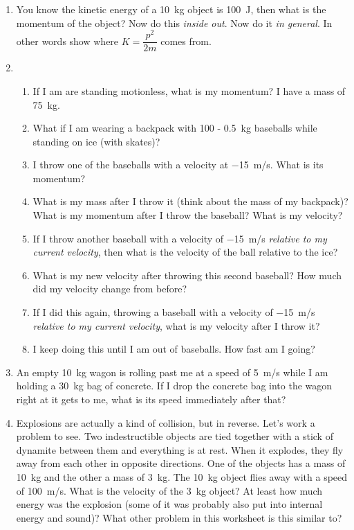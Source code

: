 \documentclass[letterpaper,12pt]{article}
\let\olditem\item
\renewcommand{\item}{\Needspace{6\baselineskip}\olditem}
\renewcommand{\bigskip}{\needspace{1in}\vspace{1in}}
\newcommand{\hugeskip}{\needspace{2in}\vspace{2in}}
\begin{document}
\begin{enumerate}
	
	\item You know the kinetic energy of a \SI{10}{kg} object is \SI{100}{\joule}, then what is the momentum of the object? Now do this \emph{inside out}. Now do it \emph{in general}. In other words show where $K=\dfrac{p^2}{2m}$ comes from.
	
	\item
	\begin{enumerate}
		\item If I am are standing motionless, what is my momentum? I have a mass of \SI{75}{kg}.\bigskip
		\item What if I am wearing a backpack with 100 - \SI{0.5}{kg} baseballs while standing on ice (with skates)?\bigskip
		\item I throw one of the baseballs with a velocity at \SI{-15}{m/s}. What is its momentum?\bigskip
		\item What is my mass after I throw it (think about the mass of my backpack)? What is my momentum after I throw the baseball? What is my velocity?\bigskip
		\item If I throw another baseball with a velocity of \SI{-15}{m/s} \emph{relative to my current velocity}, then what is the velocity of the ball relative to the ice?\bigskip
		\item What is my new velocity after throwing this second baseball? How much did my velocity change from before?\bigskip
		\item If I did this again, throwing a baseball with a velocity of \SI{-15}{m/s} \emph{relative to my current velocity}, what is my velocity after I throw it?\bigskip
		\item I keep doing this until I am out of baseballs. How fast am I going?\hugeskip
	\end{enumerate}
	
	\item An empty \SI{10}{kg} wagon is rolling past me at a speed of \SI{5}{m/s} while I am holding a \SI{30}{kg} bag of concrete. If I drop the concrete bag into the wagon right at it gets to me, what is its speed immediately after that?\bigskip
	
	
	
	\item Explosions are actually a kind of collision, but in reverse. Let's work a problem to see. Two indestructible objects are tied together with a stick of dynamite between them and everything is at rest. When it explodes, they fly away from each other in opposite directions. One of the objects has a mass of \SI{10}{kg} and the other a mass of \SI{3}{kg}. The \SI{10}{kg} object flies away with a speed of \SI{100}{m/s}. What is the velocity of the \SI{3}{kg} object? At least how much energy was the explosion (some of it was probably also put into internal energy and sound)? What other problem in this worksheet is this similar to?
	

\end{enumerate}
\end{document}
